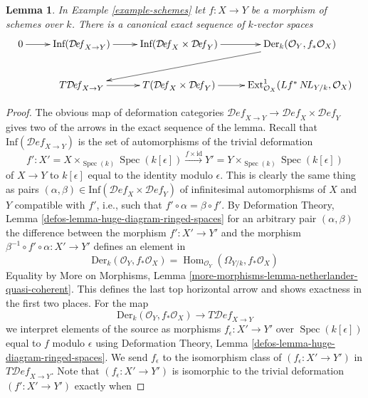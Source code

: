 \documentclass{stacks-project}
\theoremstyle{plain}
\newtheorem{lemma}[subsection]{Lemma}
\theoremstyle{definition}
\theoremstyle{remark}
\numberwithin{equation}{subsection}
\def\Spec{\mathop{\mathrm{Spec}}}
\def\Hom{\mathop{\mathrm{Hom}}\nolimits}
\def\NL{\mathop{N\!L}\nolimits}
\def\Deformationcategory{\mathcal{D}\!\mathit{ef}}
\begin{document}
\begin{lemma}
\label{lemma-schemes-morphisms-TI}
In Example \ref{example-schemes} let $f : X \to Y$ be a morphism of schemes
over $k$. There is a canonical exact sequence of $k$-vector spaces
$$
\xymatrix{
0 \ar[r] &
\text{Inf}(\Deformationcategory_{X \to Y}) \ar[r] &
\text{Inf}(\Deformationcategory_X \times \Deformationcategory_Y) \ar[r] &
\text{Der}_k(\mathcal{O}_Y, f_*\mathcal{O}_X) \ar[lld] \\
& T\Deformationcategory_{X \to Y} \ar[r] &
T(\Deformationcategory_X \times \Deformationcategory_Y) \ar[r] &
\text{Ext}^1_{\mathcal{O}_X}(Lf^*\NL_{Y/k}, \mathcal{O}_X)
}
$$
\end{lemma}

\begin{proof}
The obvious map of deformation categories
$\Deformationcategory_{X \to Y} \to
\Deformationcategory_X \times \Deformationcategory_Y$
gives two of the arrows in the exact sequence of the lemma.
Recall that $\text{Inf}(\Deformationcategory_{X \to Y})$
is the set of automorphisms of the trivial deformation
$$
f' :  X' = X \times_{\Spec(k)} \Spec(k[\epsilon])
\xrightarrow{f \times \text{id}}
Y' = Y \times_{\Spec(k)} \Spec(k[\epsilon])
$$
of $X \to Y$ to $k[\epsilon]$ equal to the identity modulo $\epsilon$.
This is clearly the same thing as pairs
$(\alpha, \beta) \in
\text{Inf}(\Deformationcategory_X \times \Deformationcategory_Y)$
of infinitesimal automorphisms of $X$ and $Y$ compatible with $f'$, i.e.,
such that $f' \circ \alpha = \beta \circ f'$.
By Deformation Theory, Lemma \ref{defos-lemma-huge-diagram-ringed-spaces}
for an arbitrary pair $(\alpha, \beta)$ the difference between
the morphism $f' : X' \to Y'$ and the morphism
$\beta^{-1} \circ f' \circ \alpha : X' \to Y'$ defines an element
in
$$
\text{Der}_k(\mathcal{O}_Y, f_*\mathcal{O}_X) =
\Hom_{\mathcal{O}_Y}(\Omega_{Y/k}, f_*\mathcal{O}_X)
$$
Equality by More on Morphisms, Lemma
\ref{more-morphisms-lemma-netherlander-quasi-coherent}.
This defines the last top horizontal arrow and shows exactness
in the first two places. For the map
$$
\text{Der}_k(\mathcal{O}_Y, f_*\mathcal{O}_X)
\to
T\Deformationcategory_{X \to Y}
$$
we interpret elements of the source as morphisms
$f_\epsilon : X' \to Y'$ over $\Spec(k[\epsilon])$
equal to $f$ modulo $\epsilon$
using Deformation Theory, Lemma \ref{defos-lemma-huge-diagram-ringed-spaces}.
We send $f_\epsilon$ to the isomorphism class of
$(f_\epsilon : X' \to Y')$ in $T\Deformationcategory_{X \to Y}$.
Note that $(f_\epsilon : X' \to Y')$ is isomorphic to the
trivial deformation $(f' : X' \to Y')$ exactly when

\end{proof}
\end{document}
